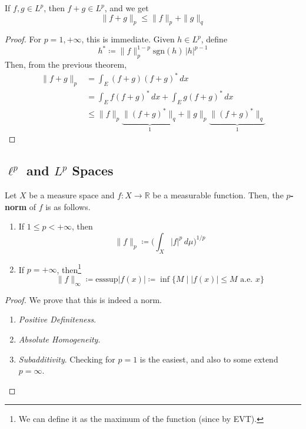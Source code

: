   \begin{lemma}[Minkowski]
    \label{thm:minkowski}
    If $f, g \in L^p$, then $f + g \in L^p$, and we get 
    \begin{equation}
      \| f + g \|_p \leq \|f\|_p + \|g\|_q
    \end{equation}
  \end{lemma}
	\begin{proof}
		For $p = 1, +\infty$, this is immediate. Given $h \in L^p$, define 
    \begin{equation}
      h^\ast \coloneqq \|f\|_p^{1-p} \mathrm{sgn}(h) \, |h|^{p-1} 
    \end{equation}
    Then, from the previous theorem, 
    \begin{align}
      \| f + g \|_p & = \int_E (f + g)(f + g)^\ast \,dx  \\ 
                    & = \int_E f (f + g)^\ast \,dx + \int_E g (f + g)^\ast \,dx  \\ 
                    & \leq \|f\|_p \underbrace{\|(f + g)^\ast\|_q}_{1} + \|g\|_p \underbrace{\|(f + g)^\ast\|_q}_{1} 
    \end{align}
	\end{proof}

\subsection{\texorpdfstring{$\ell^p$}{lp} and \texorpdfstring{$L^p$}{Lp} Spaces}

	\begin{definition}[$p$-Norm]
		Let $X$ be a measure space and $f: X \to \mathbb{R}$ be a measurable function. Then, the \textbf{$p$-norm} of $f$ is as follows. 
		\begin{enumerate}
		  \item If $1 \leq p < +\infty$, then 
				\begin{equation}
					\|f\|_p \coloneqq \bigg( \int_X |f|^p \,d\mu \bigg)^{1/p}
				\end{equation}

			\item If $p = +\infty$, then\footnote{We can define it as the maximum of the function (since by EVT).}
				\begin{equation}
					\|f\|_{\infty} \coloneqq \mathrm{esssup} |f(x)| \coloneqq \inf \{ M \mid |f(x)| \leq M \text{ a.e. } x\}
				\end{equation}
		\end{enumerate}
	\end{definition}
	\begin{proof}
	  We prove that this is indeed a norm. 
		\begin{enumerate}
		  \item \textit{Positive Definiteness}. 
			\item \textit{Absolute Homogeneity}. 
			\item \textit{Subadditivity}. Checking for $p=1$ is the easiest, and also to some extend $p=\infty$. 
		\end{enumerate}
	\end{proof}

